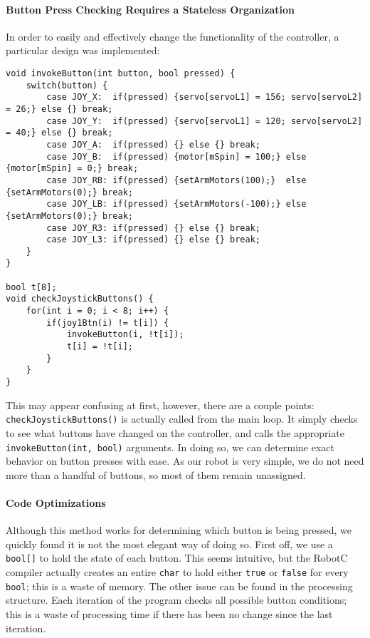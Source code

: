 \paragraph{Button Press Checking Requires a Stateless Organization} In order to easily and effectively change the functionality of the controller, a particular design was implemented:

\begin{lstlisting}[tabsize=4]
void invokeButton(int button, bool pressed) {
	switch(button) {
		case JOY_X:  if(pressed) {servo[servoL1] = 156; servo[servoL2] = 26;} else {} break;
		case JOY_Y:  if(pressed) {servo[servoL1] = 120; servo[servoL2] = 40;} else {} break;
		case JOY_A:  if(pressed) {} else {} break;
		case JOY_B:  if(pressed) {motor[mSpin] = 100;} else {motor[mSpin] = 0;} break;
		case JOY_RB: if(pressed) {setArmMotors(100);}  else {setArmMotors(0);} break;
		case JOY_LB: if(pressed) {setArmMotors(-100);} else {setArmMotors(0);} break;
		case JOY_R3: if(pressed) {} else {} break;
		case JOY_L3: if(pressed) {} else {} break;
	}
}

bool t[8];
void checkJoystickButtons() {
	for(int i = 0; i < 8; i++) {
		if(joy1Btn(i) != t[i]) {
			invokeButton(i, !t[i]);
			t[i] = !t[i]; 
		}
	}
}
\end{lstlisting}

This may appear confusing at first, however, there are a couple points: \lstinline{checkJoystickButtons()}{} is actually called from the main loop. It simply checks to see what buttons have changed on the controller, and calls the appropriate \lstinline{invokeButton(int, bool)}{} arguments. In doing so, we can determine exact behavior on button presses with ease. As our robot is very simple, we do not need more than a handful of buttons, so most of them remain unassigned.

\newpage \paragraph{Code Optimizations} Although this method works for determining which button is being pressed, we quickly found it is not the most elegant way of doing so. First off, we use a \lstinline{bool[]}{} to hold the state of each button. This seems intuitive, but the RobotC compiler actually creates an entire \lstinline{char}{} to hold either \lstinline{true}{} or \lstinline{false}{} for every \lstinline{bool}{}; this is a waste of memory. The other issue can be found in the processing structure. Each iteration of the program checks all possible button conditions; this is a waste of processing time if there has been no change since the last iteration.

